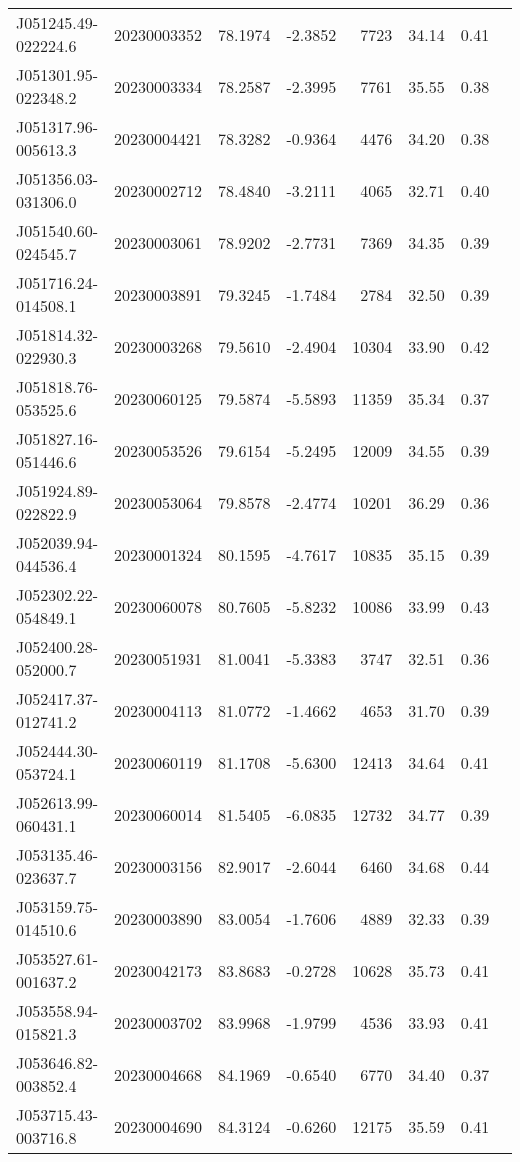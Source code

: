\documentclass{article}
\begin{document}
\begin {longtable}{|l|l|r|r|r|r|r|l|}
 J051245.49-022224.6&  20230003352&   78.1974&   -2.3852&  7723& 34.14& 0.41&\\
 J051301.95-022348.2&  20230003334&   78.2587&   -2.3995&  7761& 35.55& 0.38&\\
 J051317.96-005613.3&  20230004421&   78.3282&   -0.9364&  4476& 34.20& 0.38&\\
 J051356.03-031306.0&  20230002712&   78.4840&   -3.2111&  4065& 32.71& 0.40&\\
 J051540.60-024545.7&  20230003061&   78.9202&   -2.7731&  7369& 34.35& 0.39&\\
 J051716.24-014508.1&  20230003891&   79.3245&   -1.7484&  2784& 32.50& 0.39&\\
 J051814.32-022930.3&  20230003268&   79.5610&   -2.4904& 10304& 33.90& 0.42&\\
 J051818.76-053525.6&  20230060125&   79.5874&   -5.5893& 11359& 35.34& 0.37&\\
 J051827.16-051446.6&  20230053526&   79.6154&   -5.2495& 12009& 34.55& 0.39&\\
 J051924.89-022822.9&  20230053064&   79.8578&   -2.4774& 10201& 36.29& 0.36&\\
 J052039.94-044536.4&  20230001324&   80.1595&   -4.7617& 10835& 35.15& 0.39&\\
 J052302.22-054849.1&  20230060078&   80.7605&   -5.8232& 10086& 33.99& 0.43&\\
 J052400.28-052000.7&  20230051931&   81.0041&   -5.3383&  3747& 32.51& 0.36&\\
 J052417.37-012741.2&  20230004113&   81.0772&   -1.4662&  4653& 31.70& 0.39&\\
 J052444.30-053724.1&  20230060119&   81.1708&   -5.6300& 12413& 34.64& 0.41&\\
 J052613.99-060431.1&  20230060014&   81.5405&   -6.0835& 12732& 34.77& 0.39&\\
 J053135.46-023637.7&  20230003156&   82.9017&   -2.6044&  6460& 34.68& 0.44&\\
 J053159.75-014510.6&  20230003890&   83.0054&   -1.7606&  4889& 32.33& 0.39&\\
 J053527.61-001637.2&  20230042173&   83.8683&   -0.2728& 10628& 35.73& 0.41&\\
 J053558.94-015821.3&  20230003702&   83.9968&   -1.9799&  4536& 33.93& 0.41&\\
 J053646.82-003852.4&  20230004668&   84.1969&   -0.6540&  6770& 34.40& 0.37&\\
 J053715.43-003716.8&  20230004690&   84.3124&   -0.6260& 12175& 35.59& 0.41&\\

\end{longtable}
\end{document}
